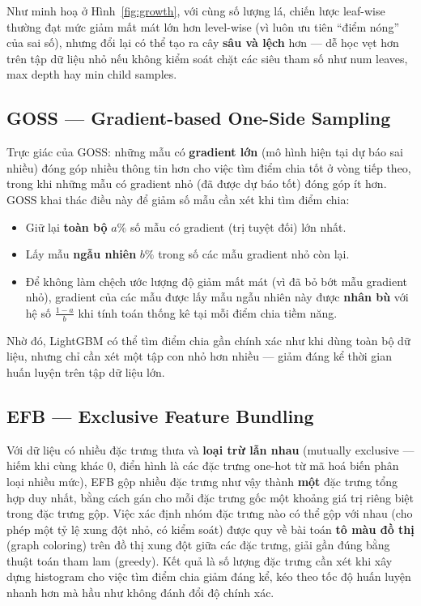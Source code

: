 \documentclass[a4paper]{article}
\newcommand{\code}[1]{{\ttfamily\def\_{\textunderscore\discretionary{}{}{}}#1}}
\def\code#1{#1}%
\def\_{ }%
\begin{document}
Như minh hoạ ở Hình~\ref{fig:growth}, với cùng số lượng lá, chiến lược
leaf-wise thường đạt mức giảm mất mát lớn hơn level-wise (vì luôn ưu tiên
``điểm nóng'' của sai số), nhưng đổi lại có thể tạo ra cây \textbf{sâu và lệch}
hơn --- dễ học vẹt hơn trên tập dữ liệu nhỏ nếu không kiểm soát chặt các siêu
tham số như \code{num\_leaves}, \code{max\_depth} hay
\code{min\_child\_samples}.

\subsection{GOSS --- Gradient-based One-Side Sampling}

Trực giác của GOSS: những mẫu có \textbf{gradient lớn} (mô hình hiện tại dự
báo sai nhiều) đóng góp nhiều thông tin hơn cho việc tìm điểm chia tốt ở vòng
tiếp theo, trong khi những mẫu có gradient nhỏ (đã được dự báo tốt) đóng góp
ít hơn. GOSS khai thác điều này để giảm số mẫu cần xét khi tìm điểm chia:

\begin{itemize}[leftmargin=*]
  \item Giữ lại \textbf{toàn bộ} $a\%$ số mẫu có gradient (trị tuyệt đối) lớn
        nhất.
  \item Lấy mẫu \textbf{ngẫu nhiên} $b\%$ trong số các mẫu gradient nhỏ còn
        lại.
  \item Để không làm chệch ước lượng độ giảm mất mát (vì đã bỏ bớt mẫu gradient
        nhỏ), gradient của các mẫu được lấy mẫu ngẫu nhiên này được
        \textbf{nhân bù} với hệ số $\frac{1-a}{b}$ khi tính toán thống kê tại
        mỗi điểm chia tiềm năng.
\end{itemize}

Nhờ đó, LightGBM có thể tìm điểm chia gần chính xác như khi dùng toàn bộ dữ
liệu, nhưng chỉ cần xét một tập con nhỏ hơn nhiều --- giảm đáng kể thời gian
huấn luyện trên tập dữ liệu lớn.

\subsection{EFB --- Exclusive Feature Bundling}

Với dữ liệu có nhiều đặc trưng thưa và \textbf{loại trừ lẫn nhau} (mutually
exclusive --- hiếm khi cùng khác 0, điển hình là các đặc trưng one-hot từ mã
hoá biến phân loại nhiều mức), EFB gộp nhiều đặc trưng như vậy thành
\textbf{một} đặc trưng tổng hợp duy nhất, bằng cách gán cho mỗi đặc trưng gốc
một khoảng giá trị riêng biệt trong đặc trưng gộp. Việc xác định nhóm đặc
trưng nào có thể gộp với nhau (cho phép một tỷ lệ xung đột nhỏ, có kiểm soát)
được quy về bài toán \textbf{tô màu đồ thị} (graph coloring) trên đồ thị xung
đột giữa các đặc trưng, giải gần đúng bằng thuật toán tham lam (greedy). Kết
quả là số lượng đặc trưng cần xét khi xây dựng histogram cho việc tìm điểm
chia giảm đáng kể, kéo theo tốc độ huấn luyện nhanh hơn mà hầu như không đánh
đổi độ chính xác.
\end{document}
